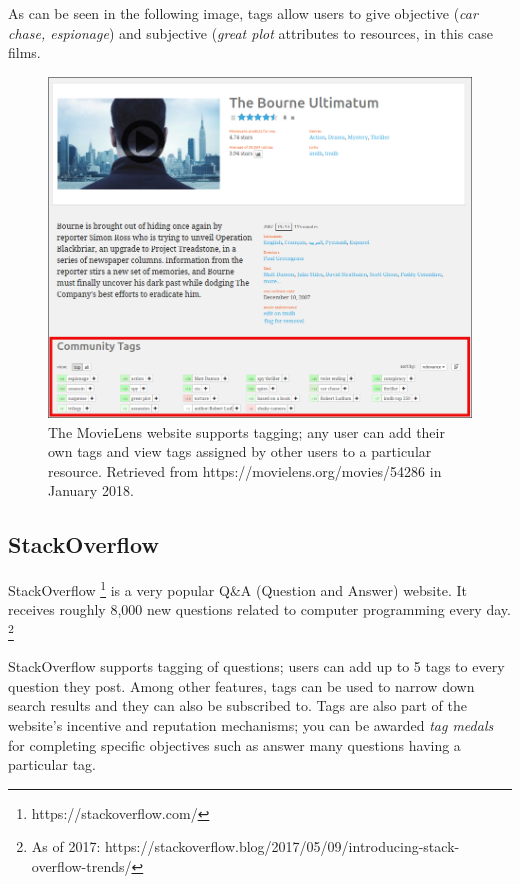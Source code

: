 As can be seen in the following image, tags allow users to give objective (\textit{car chase, espionage}) and subjective (\textit{great plot} attributes to resources, in this case films.

\begin{figure}[H]
    \centering
    \includegraphics[width=\textwidth]{chapters/02_social_tagging/images/movielens.png}
    \caption{The MovieLens website supports tagging; any user can add their own tags and view tags assigned by other users to a particular resource. Retrieved from https://movielens.org/movies/54286 in January 2018.}
    \label{fig:movielens}
\end{figure}

\subsection{StackOverflow}

StackOverflow \footnote{https://stackoverflow.com/} is a very popular Q\&A (Question and Answer) website. It receives roughly 8,000 new questions related to computer programming every day. \footnote{As of 2017: https://stackoverflow.blog/2017/05/09/introducing-stack-overflow-trends/}

StackOverflow supports tagging of questions; users can add up to 5 tags to every question they post. Among other features, tags can be used to narrow down search results and they can also be subscribed to. Tags are also part of the website's incentive and reputation mechanisms; you can be awarded \textit{tag medals} for completing specific objectives such as answer many questions having a particular tag.

